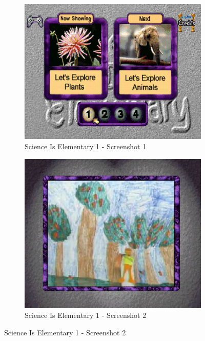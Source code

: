 \begin{figure}[H]
    \centering
    \begin{subfigure}{0.45\textwidth}
        \centering
        \includegraphics[width=\linewidth]{Games/ScienceIsElementary/Images/ScienceIsElementary1Image1.png}
        \caption{Science Is Elementary 1 - Screenshot 1}
    \end{subfigure}
    \begin{subfigure}{0.45\textwidth}
        \centering
        \includegraphics[width=\linewidth]{Games/ScienceIsElementary/Images/ScienceIsElementary1Image2.png}
        \caption{Science Is Elementary 1 - Screenshot 2}
    \end{subfigure}


\end{figure}
